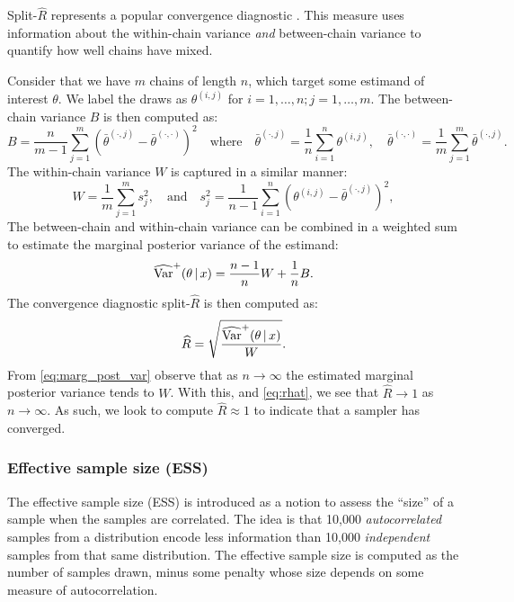 Split-$\widehat{R}$ represents a popular convergence diagnostic
\parencite{gelman13}. This measure uses information about the within-chain
variance \emph{and} between-chain variance to quantify how well chains have
mixed.

Consider that we have $m$ chains of length $n$, which target some estimand of
interest $\theta$. We label the draws as $\theta^{(i, j)}$ for $i=1,\ldots,n;
j=1,\ldots,m$. The between-chain variance $B$ is then computed as:
\begin{equation*}
  B = \frac{n}{m - 1} \sum_{j=1}^m (\bar{\theta}^{(\cdot, j)} - \bar{\theta}^{(\cdot,\cdot)})^2
    \quad \text{where} \quad
    \bar{\theta}^{(\cdot, j)} = \frac{1}{n} \sum_{i=1}^{n} \theta^{(i, j)},
    \quad
    \bar{\theta}^{(\cdot, \cdot)} = \frac{1}{m} \sum_{j=1}^m \bar{\theta}^{(\cdot, j)}.
\end{equation*}
The within-chain variance $W$ is captured in a similar manner:
\begin{equation*}
  W = \frac{1}{m} \sum_{j=1}^m s_j^2,
    \quad \text{and} \quad
    s_j^2 = \frac{1}{n-1} \sum_{i=1}^{n}(\theta^{(i, j)} - \bar{\theta}^{(\cdot,j)})^2,
\end{equation*}
The between-chain and within-chain variance can be combined in a weighted sum
to estimate the marginal posterior variance of the estimand:
\begin{equation}
  \label{eq:marg_post_var}
  \widehat{\text{Var}}^+ (\theta \,|\, x) = \frac{n-1}{n} W + \frac{1}{n} B.
\end{equation}
The convergence diagnostic split-$\widehat{R}$ is then computed as:
\begin{equation}
  \label{eq:rhat}
  \widehat{R} = \sqrt{\frac{\widehat{\text{Var}}^+ (\theta \,|\, x)}{W}}.
\end{equation}
From \cref{eq:marg_post_var} observe that as $n\rightarrow\infty$ the estimated
marginal posterior variance tends to $W$. With this, and \cref{eq:rhat}, we see
that $\widehat{R}\rightarrow1$ as $n\rightarrow\infty$. As such, we look to
compute $\widehat{R}\approx1$ to indicate that a sampler has converged.

\subsubsection{Effective sample size (ESS)}

The effective sample size (ESS) is introduced as a notion to assess the
``size'' of a sample when the samples are correlated. The idea is that 10,000
\emph{autocorrelated} samples from a distribution encode less information than
10,000 \emph{independent} samples from that same distribution. The effective
sample size is computed as the number of samples drawn, minus some penalty
whose size depends on some measure of autocorrelation.

